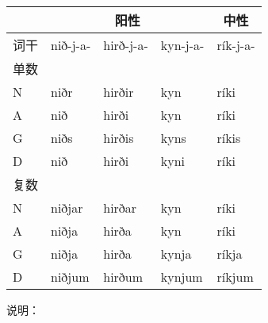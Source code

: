 \begin{longtable}{lllll}
  \toprule
     & \multicolumn{3}{c}{\textbf{阳性}} & \multicolumn{1}{c}{\textbf{中性}}                       \\
  \midrule
  \endhead
  \bottomrule
  \endfoot
  词干 & nið-j-a-                        & hirð-j-a-                       & kyn-j-a- & rík-j-a- \\
  单数 &                                 &                                 &          &          \\
  N  & niðr                            & hirðir                          & kyn      & ríki     \\
  A  & nið                             & hirði                           & kyn      & ríki     \\
  G  & niðs                            & hirðis                          & kyns     & ríkis    \\
  D  & nið                             & hirði                           & kyni     & ríki     \\
  复数 &                                 &                                 &          &          \\
  N  & niðjar                          & hirðar                          & kyn      & ríki     \\
  A  & niðja                           & hirða                           & kyn      & ríki     \\
  G  & niðja                           & hirða                           & kynja    & ríkja    \\
  D  & niðjum                          & hirðum                          & kynjum   & ríkjum   \\
\end{longtable}

说明：

